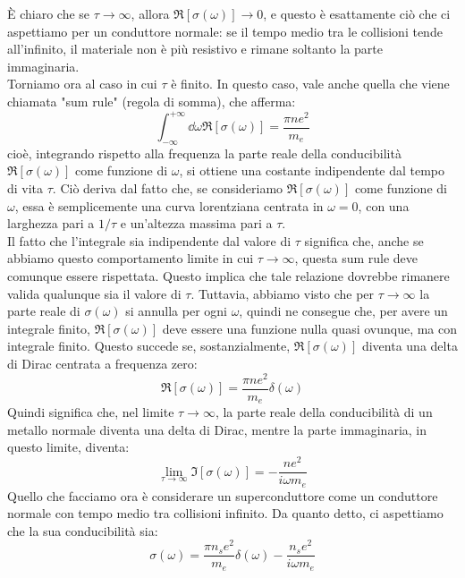 È chiaro che se $\tau \to \infty$, allora $\Re [ \sigma(\omega) ] \to 0$, e questo è esattamente ciò che ci aspettiamo per un conduttore normale: se il tempo medio tra le collisioni tende all'infinito, il materiale non è più resistivo e rimane soltanto la parte immaginaria.\\
Torniamo ora al caso in cui $\tau$ è finito. In questo caso, vale anche quella che viene chiamata "sum rule" (regola di somma), che afferma:
\begin{equation*}
   \int_{-\infty}^{+\infty} \dd{\omega} \Re [ \sigma(\omega) ]
   =\frac{\pi n e^2}{m_e}
\end{equation*}
cioè, integrando rispetto alla frequenza la parte reale della conducibilità $\Re [ \sigma(\omega) ]$ come funzione di $\omega$, si ottiene una costante indipendente dal tempo di vita $\tau$. Ciò deriva dal fatto che, se consideriamo $\Re [ \sigma(\omega) ]$ come funzione di $\omega$, essa è semplicemente una curva lorentziana centrata in $\omega=0$, con una larghezza pari a $1/\tau$ e un'altezza massima pari a $\tau$.\\
Il fatto che l'integrale sia indipendente dal valore di $\tau$ significa che, anche se abbiamo questo comportamento limite in cui $\tau \to \infty$, questa sum rule deve comunque essere rispettata. Questo implica che tale relazione dovrebbe rimanere valida qualunque sia il valore di $\tau$. Tuttavia, abbiamo visto che per $\tau \to \infty$ la parte reale di $\sigma(\omega)$ si annulla per ogni $\omega$, quindi ne consegue che, per avere un integrale finito, $\Re [ \sigma(\omega) ]$ deve essere una funzione nulla quasi ovunque, ma con integrale finito. Questo succede se, sostanzialmente, $\Re [ \sigma(\omega) ]$ diventa una delta di Dirac centrata a frequenza zero:
\begin{equation*}
   \Re [ \sigma(\omega) ]
   =\frac{\pi n e^2}{m_e} \delta(\omega)
\end{equation*}
Quindi significa che, nel limite $\tau \to \infty$, la parte reale della conducibilità di un metallo normale diventa una delta di Dirac, mentre la parte immaginaria, in questo limite, diventa:
\begin{equation*}
   \lim_{\tau \to \infty} \Im [ \sigma(\omega) ]
   =-\frac{n e^2}{i \omega m_e}
\end{equation*}
Quello che facciamo ora è considerare un superconduttore come un conduttore normale con tempo medio tra collisioni infinito. Da quanto detto, ci aspettiamo che la sua conducibilità sia:
\begin{equation}
   \sigma(\omega)
   =\frac{\pi n_s e^2}{m_e} \delta(\omega) - \frac{n_s e^2}{i \omega m_e}
   \label{eq:conduttivita_superconduttore}
\end{equation}
